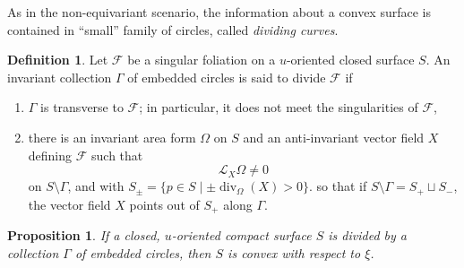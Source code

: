 \documentclass[a4paper, 11pt]{amsart}
\theoremstyle{plain}
\newtheorem{prop}{Proposition}[section]
\theoremstyle{definition}
\newtheorem{defin}[defin]{Definition}
\newcommand{\Lie}{\mathcal{L}}
\newcommand{\FF}{\mathcal{F}}
\DeclareMathOperator{\diver}{div}
\begin{document}
As in the non-equivariant scenario, the information about a convex surface is contained in ``small'' family of circles, called \emph{dividing curves}.
\begin{defin}\label{defconvex}
	Let $\FF$ be a singular foliation on a $u$-oriented closed surface $S$. An invariant collection $\Gamma$ of embedded circles is said to divide $\FF$ if
	\begin{enumerate}
		\item $\Gamma$ is transverse to $\FF$; in particular, it does not meet the singularities of $\FF$,
		\item there is an invariant area form $\Omega$ on $S$ and an anti-invariant vector field $X$ defining $\FF$ such that
		\[
		\Lie_X\Omega \neq 0
		\]
		on $S \setminus \Gamma$, and with $S_\pm = \{p \in S \mid \pm \diver_\Omega(X) > 0\}$. so that if $S \setminus \Gamma = S_+ \sqcup S_-$, the vector field $X$ points out of $S_+$ along $\Gamma$.
	\end{enumerate}
\end{defin}
\begin{prop}\label{divconvex}
	If a closed, $u$-oriented compact surface $S$ is divided by a collection $\Gamma$ of embedded circles, then $S$ is convex with respect to $\xi$.
\end{prop}
\end{document}
